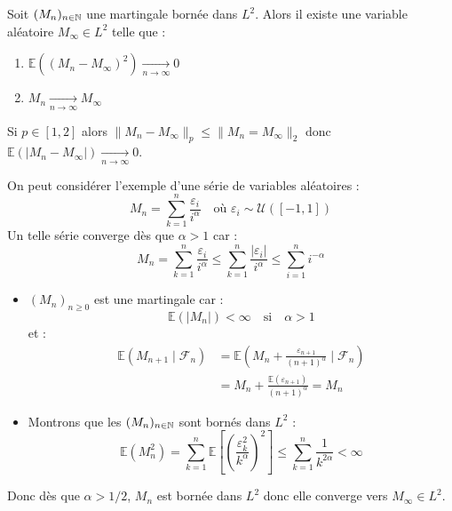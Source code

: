 \begin{theorem}[Convergence]
    Soit $(M_n)_{n \in \mathbb{N}}$ une martingale bornée dans $L^2$. Alors il existe une variable 
    aléatoire $M_\infty \in L^2$ telle que : 
    \begin{enumerate}[label=\roman*)]
        \item $ \mathbb{E}((M_n - M_\infty)^2) \underset{n \to \infty}{\longrightarrow} 0 $
        \item $ M_n \underset{n \to \infty}{\longrightarrow} M_\infty $
    \end{enumerate}
\end{theorem}

Si $p \in [1,2]$ alors $ \| M_n - M_\infty \|_p \leqslant \|M_n = M_\infty\|_2$ donc 
$ \mathbb{E}(| M_n - M_\infty|) \underset{n \to \infty}{\longrightarrow} 0$.

\begin{example}
    On peut considérer l'exemple d'une série de variables aléatoires : 
        $$ M_n = \sum_{k=1}^{n} \frac{ \varepsilon_i}{i^\alpha} \quad \text{où } \varepsilon_i \sim \mathcal{U}([-1,1]) $$ 
    Un telle série converge dès que $ \alpha > 1$ car : 
        $$ M_n = \sum_{k=1}^{n} \frac{ \varepsilon_i}{i^\alpha} \leqslant \sum_{k=1}^{n} \frac{| \varepsilon_i|}{i^\alpha} \leqslant \sum_{i=1}^{n} i^{- \alpha} $$ 
    \begin{itemize}
        \item $(M_n)_{n \geqslant 0}$ est une martingale car : 
            $$ \mathbb{E}(|M_n|) < \infty \quad \text{si} \quad \alpha > 1 $$ 
            et : 
            \begin{align*}
                \mathbb{E}(M_{n+1} \mid \mathcal{F}_n) &= \mathbb{E} \left( M_n + \frac{ \varepsilon_{n+1}}{(n+1)^\alpha} \mid \mathcal{F}_n\right) \\ 
                &= M_n + \frac{ \mathbb{E}( \varepsilon_{n+1})}{(n+1)^\alpha} = M_n 
            \end{align*} 
        \item Montrons que les $(M_n)_{n \in \mathbb{N}}$ sont bornés dans $L^2$ : 
             $$ \mathbb{E}(M_n^2) = \sum_{k=1}^{n} \mathbb{E} \left[ \left( \frac{ \varepsilon_k^2}{k^\alpha}\right)^2 \right] \leqslant \sum_{k=1}^{n} \frac{1}{k^{2\alpha}} < \infty $$ 
    \end{itemize}
    Donc dès que $ \alpha > 1/2$, $M_n$ est bornée dans $L^2$ donc elle converge 
    vers $M_\infty \in L^2$.
\end{example}

